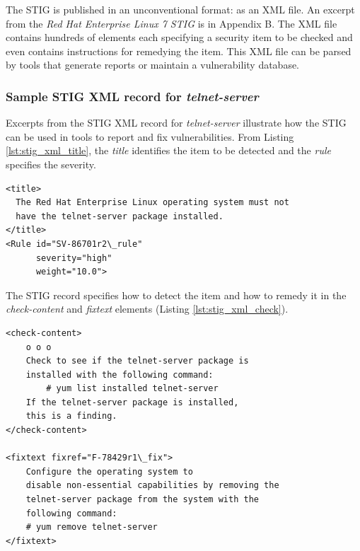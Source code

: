 \documentclass[12pt]{article}
\begin{document}
The STIG is published in an unconventional format: as an XML file.  An excerpt
from the \emph{Red Hat Enterprise Linux 7 STIG} is in Appendix B.  The XML file
contains hundreds of elements each specifying a security item to be checked
and even contains instructions for remedying the item.  This XML file can be
parsed by tools that generate reports or maintain a vulnerability database.

\subsubsection{Sample STIG XML record for \emph{telnet-server}}

Excerpts from the STIG XML record for \emph{telnet-server} illustrate how the
STIG can be used in tools to report and fix vulnerabilities.  From Listing
\ref{lst:stig_xml_title}, the \emph{title} identifies the item to be detected and
the \emph{rule} specifies the severity.

\lstset{
    language=xml,
    basicstyle=\footnotesize\ttfamily,
    linewidth=5.0in,
    frame=single,
    showstringspaces=false
}
\begin{adjustwidth}{0.5in}{0.0in}
\begin{lstlisting}[caption={STIG record \emph{title} and \emph{rule}},
label={lst:stig_xml_title}]
<title>
  The Red Hat Enterprise Linux operating system must not
  have the telnet-server package installed.
</title>
<Rule id="SV-86701r2\_rule"
      severity="high"
      weight="10.0">
\end{lstlisting}
\end{adjustwidth}
\vspace{0.8cm}

The STIG record specifies how to detect the item and how to remedy it in the
\emph{check-content} and \emph{fixtext} elements (Listing
\ref{lst:stig_xml_check}).

\lstset{
    language=xml,
    basicstyle=\footnotesize\ttfamily,
    linewidth=5.0in,
    frame=single,
    showstringspaces=false
}
\begin{adjustwidth}{0.5in}{0.0in}
\begin{minipage}{\linewidth}
\begin{lstlisting}[caption={STIG record \emph{check-content} and \emph{fixtext}},
label={lst:stig_xml_check}]
<check-content>
    o o o
    Check to see if the telnet-server package is
    installed with the following command:
        # yum list installed telnet-server
    If the telnet-server package is installed,
    this is a finding.
</check-content>

<fixtext fixref="F-78429r1\_fix">
    Configure the operating system to
    disable non-essential capabilities by removing the
    telnet-server package from the system with the
    following command:
    # yum remove telnet-server
</fixtext>
\end{lstlisting}
\end{minipage}
\end{adjustwidth}
\vspace{0.8cm}
\end{document}
